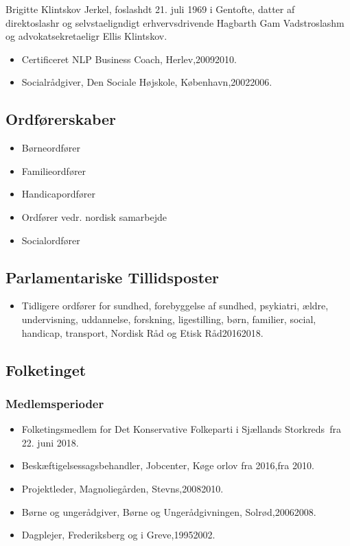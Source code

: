 \documentclass[11pt, a4paper]{awesome-cv}
\begin{document}
\makecvheader[R]
\makelettertitle
\begin{cvletter}
Brigitte Klintskov Jerkel, foslashdt 21. juli 1969 i Gentofte, datter af direktoslashr og selvstaeligndigt erhvervsdrivende Hagbarth Gam Vadstroslashm og advokatsekretaeligr Ellis Klintskov.

\begin{itemize}
\item Certificeret NLP Business Coach, Herlev,20092010.
\item Socialrådgiver, Den Sociale Højskole, København,20022006.
\end{itemize}
\subsection*{Ordførerskaber}
\begin{itemize}
\item Børneordfører
\item Familieordfører
\item Handicapordfører
\item Ordfører vedr. nordisk samarbejde
\item Socialordfører
\end{itemize}
\subsection*{Parlamentariske Tillidsposter}
\begin{itemize}
\item Tidligere ordfører for sundhed, forebyggelse af sundhed, psykiatri, ældre, undervisning, uddannelse, forskning, ligestilling, børn, familier, social, handicap, transport, Nordisk Råd og Etisk Råd20162018.
\end{itemize}
\subsection*{Folketinget}
\subsubsection*{Medlemsperioder}
\begin{itemize}
\item Folketingsmedlem for Det Konservative Folkeparti i Sjællands Storkreds fra 22. juni 2018.
\end{itemize}
\begin{itemize}
\item Beskæftigelsessagsbehandler, Jobcenter, Køge orlov fra 2016,fra 2010.
\item Projektleder, Magnoliegården, Stevns,20082010.
\item Børne og ungerådgiver, Børne og Ungerådgivningen, Solrød,20062008.
\item Dagplejer, Frederiksberg og i Greve,19952002.
\end{itemize}
\end{cvletter}
\end{document}
